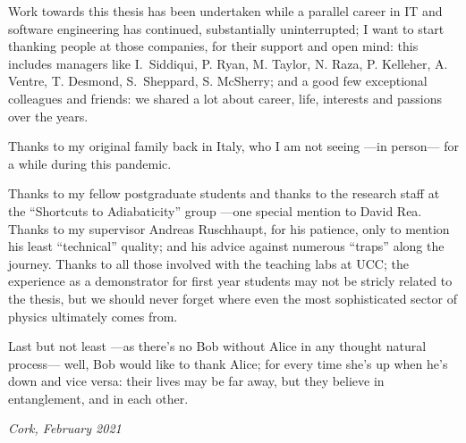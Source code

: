 {
\small
Work towards this thesis has been undertaken while a parallel career
in IT and software engineering has continued,
substantially uninterrupted;
I want to start thanking people at those companies, for their support and open mind:
this includes managers like
I.~Siddiqui, P. Ryan, M. Taylor, N. Raza, P. Kelleher, A. Ventre, T. Desmond, S.~Sheppard, S. McSherry;
and a good few exceptional colleagues and friends: we shared a lot about career, life, interests and passions over the years.

Thanks to my original family back in Italy,
who I am not seeing ---in person--- for a while during this pandemic.

Thanks to my fellow postgraduate students
and thanks to the research staff
at the ``Shortcuts to Adiabaticity'' group
---one special mention to David Rea.
Thanks to my supervisor Andreas Ruschhaupt, for his patience,
only to mention his least ``technical'' quality;
and his advice against numerous ``traps'' along the journey.
Thanks to all those involved with the teaching labs at UCC;
the  experience as a demonstrator for first year students may not be stricly related to the thesis,
but we should never forget where even the most sophisticated sector of physics
ultimately comes from.

Last but not least ---as there's no Bob without Alice in any thought natural process---
well, Bob would like to thank Alice;
for every time she’s up when he’s down and vice versa:
their lives may be far away, but they believe in entanglement, and in each other.

\textit{Cork, February 2021}
}